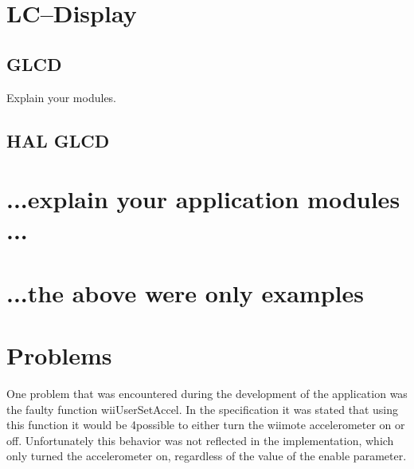 \documentclass[12pt,a4paper,titlepage,oneside]{article}
\begin{document}
\section{LC--Display}

\subsection{GLCD}

Explain your modules.

\subsection{HAL GLCD}



\section{...explain your application modules ...}

\section{...the above were only examples}



\section{Problems}

One problem that was encountered during the development of the application was the faulty
function wiiUserSetAccel. In the specification it was stated that using this function it would be
4possible to either turn the wiimote accelerometer on or off. Unfortunately this behavior was
not reflected in the implementation, which only turned the accelerometer on, regardless of the
value of the enable parameter.
\end{document}
